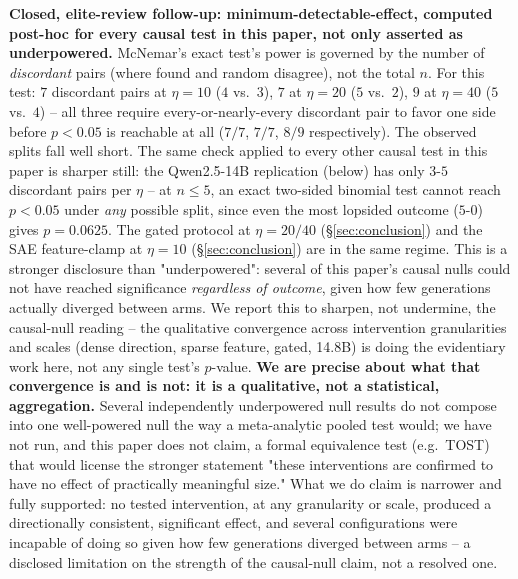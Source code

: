 \documentclass[10pt,twocolumn]{article}
\begin{document}
\textbf{Closed, elite-review follow-up: minimum-detectable-effect,
computed post-hoc for every causal test in this paper, not only
asserted as underpowered.} McNemar's exact test's power is governed by
the number of \emph{discordant} pairs (where found and random
disagree), not the total $n$. For this test: $7$ discordant pairs at
$\eta=10$ ($4$ vs.\ $3$), $7$ at $\eta=20$ ($5$ vs.\ $2$), $9$ at
$\eta=40$ ($5$ vs.\ $4$) -- all three require every-or-nearly-every
discordant pair to favor one side before $p<0.05$ is reachable at all
($7/7$, $7/7$, $8/9$ respectively). The observed splits fall well short.
The same check applied to every other causal test in this paper is
sharper still: the Qwen2.5-14B replication (below) has only $3$-$5$
discordant pairs per $\eta$ -- at $n\leq5$, an exact two-sided binomial
test cannot reach $p<0.05$ under \emph{any} possible split, since even
the most lopsided outcome ($5$-$0$) gives $p=0.0625$. The gated
protocol at $\eta=20/40$ (\S\ref{sec:conclusion}) and the SAE
feature-clamp at $\eta=10$ (\S\ref{sec:conclusion}) are in the same
regime. This is a stronger disclosure than "underpowered": several of
this paper's causal nulls could not have reached significance
\emph{regardless of outcome}, given how few generations actually
diverged between arms. We report this to sharpen, not undermine, the
causal-null reading -- the qualitative convergence across intervention
granularities and scales (dense direction, sparse feature, gated,
14.8B) is doing the evidentiary work here, not any single test's
$p$-value. \textbf{We are precise about what that convergence is and is
not: it is a qualitative, not a statistical, aggregation.} Several
independently underpowered null results do not compose into one
well-powered null the way a meta-analytic pooled test would; we have
not run, and this paper does not claim, a formal equivalence test
(e.g.\ TOST) that would license the stronger statement "these
interventions are confirmed to have no effect of practically meaningful
size." What we do claim is narrower and fully supported: no tested
intervention, at any granularity or scale, produced a directionally
consistent, significant effect, and several configurations were
incapable of doing so given how few generations diverged between arms
-- a disclosed limitation on the strength of the causal-null claim, not
a resolved one.
\end{document}
